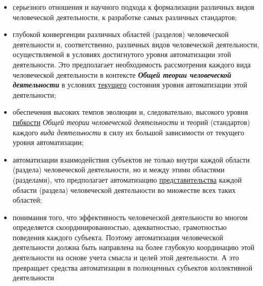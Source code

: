 \begin{scnsubstruct}
{\begin{itemize}
            \item серьезного отношения и научного подхода к формализации различных видов человеческой деятельности, к разработке самых различных стандартов;
            \item глубокой конвергенции различных областей (разделов) человеческой деятельности и, соответственно, различных видов человеческой деятельности, осуществляемой в условиях достигнутого уровня автоматизации этой деятельности. Это предполагает необходимость рассмотрения каждого вида человеческой деятельности в контексте \textbf{\textit{Общей теории человеческой деятельности}} в условиях \underline{текущего} состояния уровня автоматизации этой деятельности;
            \item обеспечения высоких темпов эволюции и, следовательно, высокого уровня \underline{гибкости} \textit{Общей теории человеческой деятельности} и теорий (стандартов) каждого \textit{вида деятельности} в силу их большой зависимости от текущего уровня автоматизации;
            \item автоматизации взаимодействия субъектов не только внутри каждой области (раздела) человеческой деятельности, но и между этими областями (разделами), что предполагает автоматизацию \underline{представительства} каждой области (раздела) человеческой деятельности во множестве всех таких областей;
            \item понимания того, что эффективность человеческой деятельности во многом определяется скоординированностью, адекватностью, грамотностью поведения каждого субъекта. Поэтому автоматизация человеческой деятельности должна быть направлена на более глубокую координацию этой деятельности на основе учета смысла и целей этой деятельности. А это превращает средства автоматизации в полноценных субъектов коллективной деятельности
        \end{itemize}}
    
    

\end{scnsubstruct}
